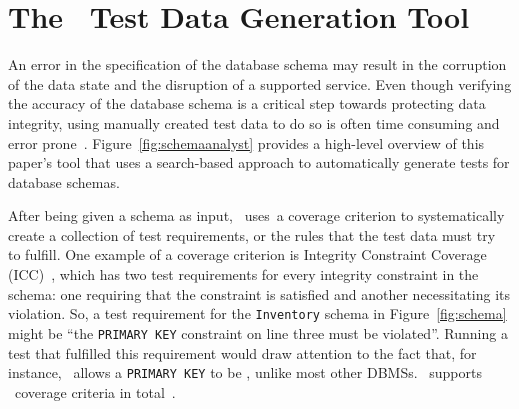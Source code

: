 \section{The \sa~Test Data Generation Tool}\label{sec:technique}


An error in the specification of the database schema may result in the corruption of the data state and the disruption
of a supported service. Even though verifying the accuracy of the database schema is a critical step towards protecting
data integrity, using manually created test data to do so is often time consuming and error
prone~\cite{kapfhammer2013search}. Figure~\ref{fig:schemaanalyst} provides a high-level overview of this paper's tool
that uses a search-based approach to automatically generate tests for database schemas.


After being given a schema as input, \mbox{\sa~uses a} coverage criterion to systematically create a collection of test
requirements, or the rules that the test data must try to fulfill. One example of a coverage criterion
is Integrity Constraint Coverage (ICC)~\cite{mcminn2015effectiveness}, which has two test requirements for every
integrity constraint in the schema: one requiring that the constraint is satisfied and another necessitating its
violation. So, a test requirement for the \texttt{Inventory} schema in Figure~\ref{fig:schema} might be ``the
\texttt{PRIMARY KEY} constraint on line three must be violated''. Running a test that fulfilled this requirement would
draw attention to the fact that, for instance, \sqlite~allows a \texttt{PRIMARY KEY} to be \NULL, unlike most other
DBMSs. \sa~supports \numcoveragecriteria~coverage criteria in total~\cite{mcminn2015effectiveness}.





